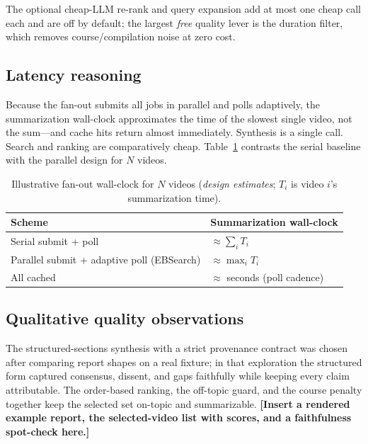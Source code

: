 \documentclass[conference]{IEEEtran}
\begin{document}
The optional cheap-LLM re-rank and query expansion add at most one cheap call
each and are off by default; the largest \emph{free} quality lever is the
duration filter, which removes course/compilation noise at zero cost.

\subsection{Latency reasoning}

Because the fan-out submits all jobs in parallel and polls adaptively, the
summarization wall-clock approximates the time of the slowest single video, not
the sum---and cache hits return almost immediately. Synthesis is a single call.
Search and ranking are comparatively cheap. Table~\ref{tab:latency} contrasts
the serial baseline with the parallel design for $N$ videos.

\begin{table}[t]
\centering
\caption{Illustrative fan-out wall-clock for $N$ videos (\emph{design
estimates}; $T_i$ is video $i$'s summarization time).}
\label{tab:latency}
\footnotesize
\begin{tabular}{@{}ll@{}}
\toprule
\textbf{Scheme} & \textbf{Summarization wall-clock} \\
\midrule
Serial submit + poll      & $\approx \sum_i T_i$ \\
Parallel submit + adaptive poll (EBSearch) & $\approx \max_i T_i$ \\
All cached                & $\approx$ seconds (poll cadence) \\
\bottomrule
\end{tabular}
\end{table}

\subsection{Qualitative quality observations}

The structured-sections synthesis with a strict provenance contract was chosen
after comparing report shapes on a real fixture; in that exploration the
structured form captured consensus, dissent, and gaps faithfully while keeping
every claim attributable. The order-based ranking, the off-topic guard, and the
course penalty together keep the selected set on-topic and summarizable.
\textbf{[Insert a rendered example report, the selected-video list with scores,
and a faithfulness spot-check here.]}

\end{document}
